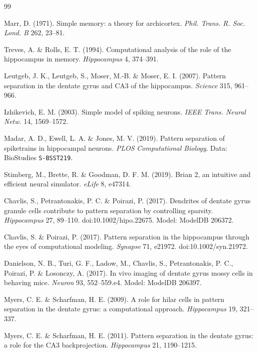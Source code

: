 \documentclass[11pt,a4paper]{article}
\begin{document}
\begin{thebibliography}{99}
\small

 Marr, D. (1971). Simple memory: a theory for archicortex.
\emph{Phil. Trans. R. Soc. Lond. B} 262, 23--81.

 Treves, A. \& Rolls, E. T. (1994). Computational analysis
of the role of the hippocampus in memory. \emph{Hippocampus} 4, 374--391.

 Leutgeb, J. K., Leutgeb, S., Moser, M.-B. \& Moser, E. I.
(2007). Pattern separation in the dentate gyrus and CA3 of the hippocampus.
\emph{Science} 315, 961--966.

 Izhikevich, E. M. (2003). Simple model of spiking
neurons. \emph{IEEE Trans. Neural Netw.} 14, 1569--1572.

 Madar, A. D., Ewell, L. A. \& Jones, M. V. (2019).
Pattern separation of spiketrains in hippocampal neurons.
\emph{PLOS Computational Biology}. Data: BioStudies \texttt{S-BSST219}.

 Stimberg, M., Brette, R. \& Goodman, D. F. M. (2019).
Brian 2, an intuitive and efficient neural simulator. \emph{eLife} 8, e47314.

 Chavlis, S., Petrantonakis, P. C. \& Poirazi, P. (2017).
Dendrites of dentate gyrus granule cells contribute to pattern separation by
controlling sparsity. \emph{Hippocampus} 27, 89--110. doi:10.1002/hipo.22675.
Model: ModelDB 206372.

 Chavlis, S. \& Poirazi, P. (2017). Pattern separation
in the hippocampus through the eyes of computational modeling. \emph{Synapse}
71, e21972. doi:10.1002/syn.21972.

 Danielson, N. B., Turi, G. F., Ladow, M., Chavlis, S.,
Petrantonakis, P. C., Poirazi, P. \& Losonczy, A. (2017). In vivo imaging of
dentate gyrus mossy cells in behaving mice. \emph{Neuron} 93, 552--559.e4.
Model: ModelDB 206397.

 Myers, C. E. \& Scharfman, H. E. (2009). A role for hilar
cells in pattern separation in the dentate gyrus: a computational approach.
\emph{Hippocampus} 19, 321--337.

 Myers, C. E. \& Scharfman, H. E. (2011). Pattern separation
in the dentate gyrus: a role for the CA3 backprojection. \emph{Hippocampus} 21,
1190--1215.


\end{thebibliography}
\end{document}
